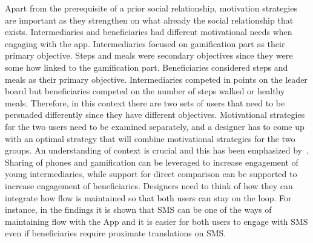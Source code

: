 Apart from the prerequisite of a prior social relationship, motivation strategies are important as they strengthen on what already the social relationship  that exists. Intermediaries and beneficiaries had different motivational needs when engaging with the app. Intermediaries focused on gamification part as their primary objective. Steps and meals were secondary objectives since they were some how linked to the gamification part. Beneficiaries considered steps and meals as their primary objective. Intermediaries competed in points on the leader board but beneficiaries competed on the number of steps walked or healthy meals. Therefore, in this context there are two sets of users that need to be persuaded differently since they have different objectives. Motivational strategies for the two users need to be examined separately, and a designer has to come up with an optimal strategy that will combine motivational strategies for the two groups. An understanding of context is crucial and this has been emphasized by~\cite{Oinas-kukkonen:psd, Oinas-Kukkonen:foundation}. Sharing of phones and gamification can be leveraged to increase engagement of young intermediaries, while support for direct comparison can be supported to increase engagement of beneficiaries. Designers need to think of how they can integrate how flow is maintained so that both users can stay on the loop. For instance, in the findings it is shown that SMS can be one of the ways of maintaining flow with the App and it is easier for both users to engage with SMS even if beneficiaries require proximate translations on SMS.
\begin{flushright}
\end{flushright}
